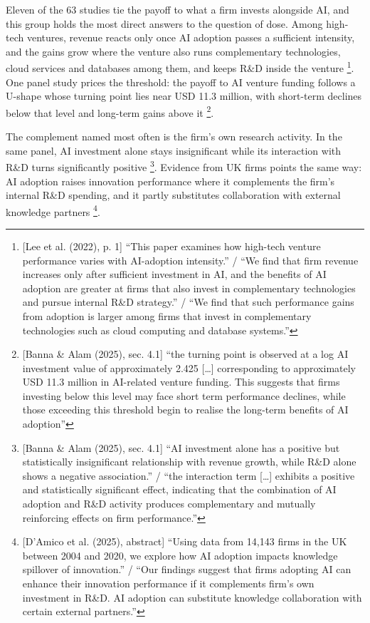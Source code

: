 Eleven of the 63 studies tie the payoff to what a firm invests alongside AI, and this group holds the most direct answers to the question of dose. Among high-tech ventures, revenue reacts only once AI adoption passes a sufficient intensity, and the gains grow where the venture also runs complementary technologies, cloud services and databases among them, and keeps R\&D inside the venture \parencite[p.~1]{lee2022adoption}\footnote{[Lee et al. (2022), p. 1] ``This paper examines how high-tech venture performance varies with AI-adoption intensity.'' / ``We find that firm revenue increases only after sufficient investment in AI, and the benefits of AI adoption are greater at firms that also invest in complementary technologies and pursue internal R\&D strategy.'' / ``We find that such performance gains from adoption is larger among firms that invest in complementary technologies such as cloud computing and database systems.''}. One panel study prices the threshold: the payoff to AI venture funding follows a U-shape whose turning point lies near USD 11.3 million, with short-term declines below that level and long-term gains above it \parencite[sec.~4.1]{banna2025value}\footnote{[Banna \& Alam (2025), sec. 4.1] ``the turning point is observed at a log AI investment value of approximately 2.425 [\dots] corresponding to approximately USD 11.3 million in AI-related venture funding. This suggests that firms investing below this level may face short term performance declines, while those exceeding this threshold begin to realise the long-term benefits of AI adoption''}.

The complement named most often is the firm's own research activity. In the same panel, AI investment alone stays insignificant while its interaction with R\&D turns significantly positive \parencite[sec.~4.1]{banna2025value}\footnote{[Banna \& Alam (2025), sec. 4.1] ``AI investment alone has a positive but statistically insignificant relationship with revenue growth, while R\&D alone shows a negative association.'' / ``the interaction term [\dots] exhibits a positive and statistically significant effect, indicating that the combination of AI adoption and R\&D activity produces complementary and mutually reinforcing effects on firm performance.''}. Evidence from UK firms points the same way: AI adoption raises innovation performance where it complements the firm's internal R\&D spending, and it partly substitutes collaboration with external knowledge partners \parencite[abstract]{damico2025enhancing}\footnote{[D'Amico et al. (2025), abstract] ``Using data from 14,143 firms in the UK between 2004 and 2020, we explore how AI adoption impacts knowledge spillover of innovation.'' / ``Our findings suggest that firms adopting AI can enhance their innovation performance if it complements firm's own investment in R\&D. AI adoption can substitute knowledge collaboration with certain external partners.''}.

